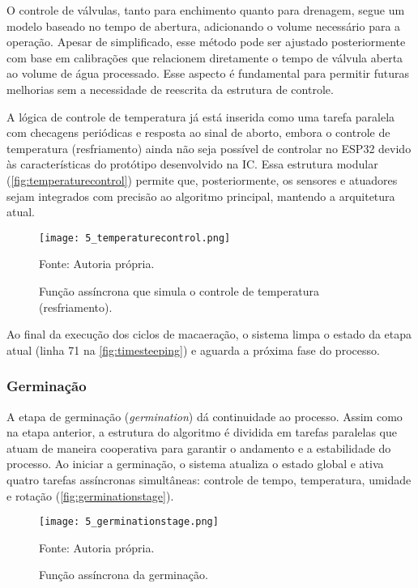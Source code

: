 O controle de válvulas, tanto para enchimento quanto para drenagem, segue um modelo baseado no tempo de abertura, adicionando o volume necessário para a operação. Apesar de simplificado, esse método pode ser ajustado posteriormente com base em calibrações que relacionem diretamente o tempo de válvula aberta ao volume de água processado. Esse aspecto é fundamental para permitir futuras melhorias sem a necessidade de reescrita da estrutura de controle.

A lógica de controle de temperatura já está inserida como uma tarefa paralela com checagens periódicas e resposta ao sinal de aborto, embora o controle de temperatura (resfriamento) ainda não seja possível de controlar no ESP32 devido às características do protótipo desenvolvido na IC. Essa estrutura modular (\autoref{fig:temperaturecontrol}) permite que, posteriormente, os sensores e atuadores sejam integrados com precisão ao algoritmo principal, mantendo a arquitetura atual.

\begin{figure}[ht]
    \centering
    \caption{Função assíncrona que simula o controle de temperatura (resfriamento).}
    \label{fig:temperaturecontrol}
    \texttt{[image: 5\_temperaturecontrol.png]}

    {\centering\footnotesize Fonte: Autoria própria.\par}
\end{figure}

Ao final da execução dos ciclos de macaeração, o sistema limpa o estado da etapa atual (linha 71 na \autoref{fig:timesteeping}) e aguarda a próxima fase do processo.

\subsubsection{Germinação}

A etapa de germinação (\textit{germination}) dá continuidade ao processo. Assim como na etapa anterior, a estrutura do algoritmo é dividida em tarefas paralelas que atuam de maneira cooperativa para garantir o andamento e a estabilidade do processo. Ao iniciar a germinação, o sistema atualiza o estado global e ativa quatro tarefas assíncronas simultâneas: controle de tempo, temperatura, umidade e rotação (\autoref{fig:germinationstage}).

\begin{figure}[ht]
    \centering
    \caption{Função assíncrona da germinação.}
    \label{fig:germinationstage}
    \texttt{[image: 5\_germinationstage.png]}

    {\centering\footnotesize Fonte: Autoria própria.\par}
\end{figure}

